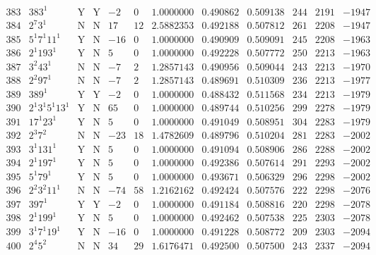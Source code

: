 \documentclass[11pt,reqno,a4letter]{article}
\numberwithin{figure}{section}
\numberwithin{table}{section}
\theoremstyle{plain}
\numberwithin{theorem}{section}
\theoremstyle{definition}
\begin{document}
\begin{table}[h!]
\begin{equation*}
{\begin{array}{cc|cc|ccc|cc|ccc}
 383 & 383^1 & \text{Y} & \text{Y} & -2 & 0 & 1.0000000 & 0.490862 & 0.509138 & 244 & 2191 & -1947 \\
 384 & 2^7 3^1 & \text{N} & \text{N} & 17 & 12 & 2.5882353 & 0.492188 & 0.507812 & 261 & 2208 & -1947 \\
 385 & 5^1 7^1 11^1 & \text{Y} & \text{N} & -16 & 0 & 1.0000000 & 0.490909 & 0.509091 & 245 & 2208 & -1963 \\
 386 & 2^1 193^1 & \text{Y} & \text{N} & 5 & 0 & 1.0000000 & 0.492228 & 0.507772 & 250 & 2213 & -1963 \\
 387 & 3^2 43^1 & \text{N} & \text{N} & -7 & 2 & 1.2857143 & 0.490956 & 0.509044 & 243 & 2213 & -1970 \\
 388 & 2^2 97^1 & \text{N} & \text{N} & -7 & 2 & 1.2857143 & 0.489691 & 0.510309 & 236 & 2213 & -1977 \\
 389 & 389^1 & \text{Y} & \text{Y} & -2 & 0 & 1.0000000 & 0.488432 & 0.511568 & 234 & 2213 & -1979 \\
 390 & 2^1 3^1 5^1 13^1 & \text{Y} & \text{N} & 65 & 0 & 1.0000000 & 0.489744 & 0.510256 & 299 & 2278 & -1979 \\
 391 & 17^1 23^1 & \text{Y} & \text{N} & 5 & 0 & 1.0000000 & 0.491049 & 0.508951 & 304 & 2283 & -1979 \\
 392 & 2^3 7^2 & \text{N} & \text{N} & -23 & 18 & 1.4782609 & 0.489796 & 0.510204 & 281 & 2283 & -2002 \\
 393 & 3^1 131^1 & \text{Y} & \text{N} & 5 & 0 & 1.0000000 & 0.491094 & 0.508906 & 286 & 2288 & -2002 \\
 394 & 2^1 197^1 & \text{Y} & \text{N} & 5 & 0 & 1.0000000 & 0.492386 & 0.507614 & 291 & 2293 & -2002 \\
 395 & 5^1 79^1 & \text{Y} & \text{N} & 5 & 0 & 1.0000000 & 0.493671 & 0.506329 & 296 & 2298 & -2002 \\
 396 & 2^2 3^2 11^1 & \text{N} & \text{N} & -74 & 58 & 1.2162162 & 0.492424 & 0.507576 & 222 & 2298 & -2076 \\
 397 & 397^1 & \text{Y} & \text{Y} & -2 & 0 & 1.0000000 & 0.491184 & 0.508816 & 220 & 2298 & -2078 \\
 398 & 2^1 199^1 & \text{Y} & \text{N} & 5 & 0 & 1.0000000 & 0.492462 & 0.507538 & 225 & 2303 & -2078 \\
 399 & 3^1 7^1 19^1 & \text{Y} & \text{N} & -16 & 0 & 1.0000000 & 0.491228 & 0.508772 & 209 & 2303 & -2094 \\
 400 & 2^4 5^2 & \text{N} & \text{N} & 34 & 29 & 1.6176471 & 0.492500 & 0.507500 & 243 & 2337 & -2094 \\

\end{array}}
\end{equation*}
\end{table}
\end{document}
